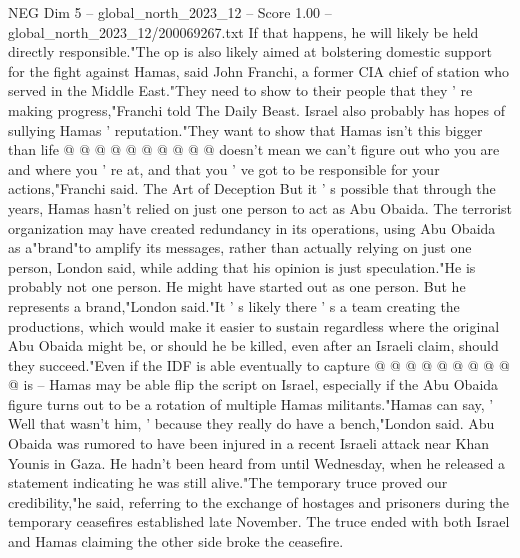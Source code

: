 \begin{textsample}{NEG Dim 5 – global\_north\_2023\_12 – Score 1.00 – global\_north\_2023\_12/200069267.txt}
If that happens, he will likely be held directly responsible."The op is also likely aimed at bolstering domestic support for the fight against Hamas, said John Franchi, a former CIA chief of station who served in the Middle East."They need to show to their people that they ' re making progress,"Franchi told The Daily Beast.
Israel also probably has hopes of sullying Hamas ' reputation."They want to show that Hamas isn't this bigger than life @ @ @ @ @ @ @ @ @ @ doesn't mean we can't figure out who you are and where you ' re at, and that you ' ve got to be responsible for your actions,"Franchi said.
The Art of Deception But it ' s possible that through the years, Hamas hasn't relied on just one person to act as Abu Obaida.
The terrorist organization may have created redundancy in its operations, using Abu Obaida as a"brand"to amplify its messages, rather than actually relying on just one person, London said, while adding that his opinion is just speculation."He is probably not one person.
He might have started out as one person.
But he represents a brand,"London said."It ' s likely there ' s a team creating the productions, which would make it easier to sustain regardless where the original Abu Obaida might be, or should he be killed, even after an Israeli claim, should they succeed."Even if the IDF is able eventually to capture @ @ @ @ @ @ @ @ @ @ is -- Hamas may be able flip the script on Israel, especially if the Abu Obaida figure turns out to be a rotation of multiple Hamas militants."Hamas can say, ' Well that wasn't him, ' because they really do have a bench,"London said.
Abu Obaida was rumored to have been injured in a recent Israeli attack near Khan Younis in Gaza.
He hadn't been heard from until Wednesday, when he released a statement indicating he was still alive."The temporary truce proved our credibility,"he said, referring to the exchange of hostages and prisoners during the temporary ceasefires established late November.
The truce ended with both Israel and Hamas claiming the other side broke the ceasefire.

\end{textsample}
